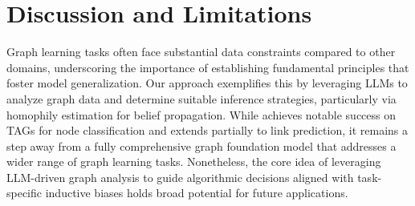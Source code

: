 \section{Discussion and Limitations}

Graph learning tasks often face substantial data constraints compared to other domains, underscoring the importance of establishing fundamental principles that foster model generalization. Our approach exemplifies this by leveraging LLMs to analyze graph data and determine suitable inference strategies, particularly via homophily estimation for belief propagation. While \proj achieves notable success on TAGs for node classification and extends partially to link prediction, it remains a step away from a fully comprehensive graph foundation model that addresses a wider range of graph learning tasks. Nonetheless, the core idea of leveraging LLM-driven graph analysis to guide algorithmic decisions aligned with task-specific inductive biases holds broad potential for future applications.


